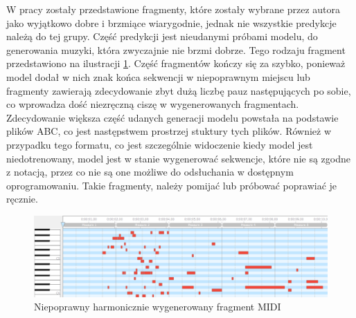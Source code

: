 \documentclass[data-science]{agh-wi} %
\begin{document}
W pracy zostały przedstawione fragmenty, które zostały wybrane przez autora jako wyjątkowo dobre i brzmiące wiarygodnie, jednak nie wszystkie predykcje należą do tej grupy. Część predykcji jest nieudanymi próbami modelu, do generowania muzyki, która zwyczajnie nie brzmi dobrze. Tego rodzaju fragment przedstawiono na ilustracji \ref*{fig:bad_midi}. Część fragmentów kończy się za szybko, ponieważ model dodał w nich znak końca sekwencji w niepoprawnym miejscu lub fragmenty zawierają zdecydowanie zbyt dużą liczbę pauz następujących po sobie, co wprowadza dość niezręczną ciszę w wygenerowanych fragmentach. Zdecydowanie większa część udanych generacji modelu powstała na podstawie plików ABC, co jest następstwem prostrzej stuktury tych plików. Również w przypadku tego formatu, co jest szczególnie widoczenie kiedy model jest niedotrenowany, model jest w stanie wygenerować sekwencje, które nie są zgodne z notacją, przez co nie są one możliwe do odsłuchania w dostępnym oprogramowaniu. Takie fragmenty, należy pomijać lub próbować poprawiać je ręcznie.

\begin{figure}
    \centering
    \includegraphics[width=0.9\linewidth]{./img/bad_midi.png}
    \caption{Niepoprawny harmonicznie wygenerowany fragment MIDI}
    \label{fig:bad_midi}
\end{figure}
\end{document}
